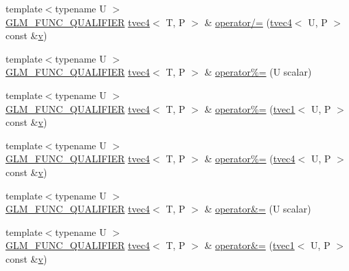 \begin{DoxyCompactItemize}
\item 
{\footnotesize template$<$typename U $>$ }\\\mbox{\hyperlink{setup_8hpp_a33fdea6f91c5f834105f7415e2a64407}{G\+L\+M\+\_\+\+F\+U\+N\+C\+\_\+\+Q\+U\+A\+L\+I\+F\+I\+ER}} \mbox{\hyperlink{structglm_1_1tvec4}{tvec4}}$<$ T, P $>$ \& \mbox{\hyperlink{structglm_1_1tvec4_accd622c14fd14f612f8cb52e1d669163}{operator/=}} (\mbox{\hyperlink{structglm_1_1tvec4}{tvec4}}$<$ U, P $>$ const \&\mbox{\hyperlink{glad_8h_a14cfbe2fc2234f5504618905b69d1e06}{v}})
\item 
{\footnotesize template$<$typename U $>$ }\\\mbox{\hyperlink{setup_8hpp_a33fdea6f91c5f834105f7415e2a64407}{G\+L\+M\+\_\+\+F\+U\+N\+C\+\_\+\+Q\+U\+A\+L\+I\+F\+I\+ER}} \mbox{\hyperlink{structglm_1_1tvec4}{tvec4}}$<$ T, P $>$ \& \mbox{\hyperlink{structglm_1_1tvec4_af438ebaf22a88b79e0db2a23738f6bb3}{operator\%=}} (U scalar)
\item 
{\footnotesize template$<$typename U $>$ }\\\mbox{\hyperlink{setup_8hpp_a33fdea6f91c5f834105f7415e2a64407}{G\+L\+M\+\_\+\+F\+U\+N\+C\+\_\+\+Q\+U\+A\+L\+I\+F\+I\+ER}} \mbox{\hyperlink{structglm_1_1tvec4}{tvec4}}$<$ T, P $>$ \& \mbox{\hyperlink{structglm_1_1tvec4_abf42924fdc633b087a0bb2d91830fbce}{operator\%=}} (\mbox{\hyperlink{structglm_1_1tvec1}{tvec1}}$<$ U, P $>$ const \&\mbox{\hyperlink{glad_8h_a14cfbe2fc2234f5504618905b69d1e06}{v}})
\item 
{\footnotesize template$<$typename U $>$ }\\\mbox{\hyperlink{setup_8hpp_a33fdea6f91c5f834105f7415e2a64407}{G\+L\+M\+\_\+\+F\+U\+N\+C\+\_\+\+Q\+U\+A\+L\+I\+F\+I\+ER}} \mbox{\hyperlink{structglm_1_1tvec4}{tvec4}}$<$ T, P $>$ \& \mbox{\hyperlink{structglm_1_1tvec4_a03faa16c94b7cb1e2082aebede1451c2}{operator\%=}} (\mbox{\hyperlink{structglm_1_1tvec4}{tvec4}}$<$ U, P $>$ const \&\mbox{\hyperlink{glad_8h_a14cfbe2fc2234f5504618905b69d1e06}{v}})
\item 
{\footnotesize template$<$typename U $>$ }\\\mbox{\hyperlink{setup_8hpp_a33fdea6f91c5f834105f7415e2a64407}{G\+L\+M\+\_\+\+F\+U\+N\+C\+\_\+\+Q\+U\+A\+L\+I\+F\+I\+ER}} \mbox{\hyperlink{structglm_1_1tvec4}{tvec4}}$<$ T, P $>$ \& \mbox{\hyperlink{structglm_1_1tvec4_a0ee724176fd182cc8666600a6f2a9020}{operator\&=}} (U scalar)
\item 
{\footnotesize template$<$typename U $>$ }\\\mbox{\hyperlink{setup_8hpp_a33fdea6f91c5f834105f7415e2a64407}{G\+L\+M\+\_\+\+F\+U\+N\+C\+\_\+\+Q\+U\+A\+L\+I\+F\+I\+ER}} \mbox{\hyperlink{structglm_1_1tvec4}{tvec4}}$<$ T, P $>$ \& \mbox{\hyperlink{structglm_1_1tvec4_ad19ec50f613001b73a1eae23d9411d71}{operator\&=}} (\mbox{\hyperlink{structglm_1_1tvec1}{tvec1}}$<$ U, P $>$ const \&\mbox{\hyperlink{glad_8h_a14cfbe2fc2234f5504618905b69d1e06}{v}})

\end{DoxyCompactItemize}
